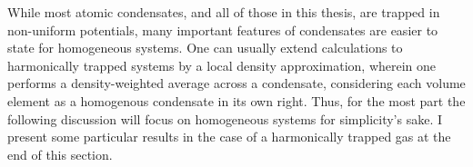 	While most atomic condensates, and all of those in this thesis, are trapped in non-uniform potentials, many important features of condensates are easier to state for homogeneous systems. One can usually extend calculations to harmonically trapped systems by a local density approximation, wherein one performs a density-weighted average across a condensate, considering each volume element as a homogenous condensate in its own right. Thus, for the most part the following discussion will focus on homogeneous systems for simplicity's sake. I present some particular results in the case of a harmonically trapped gas at the end of this section.



	
